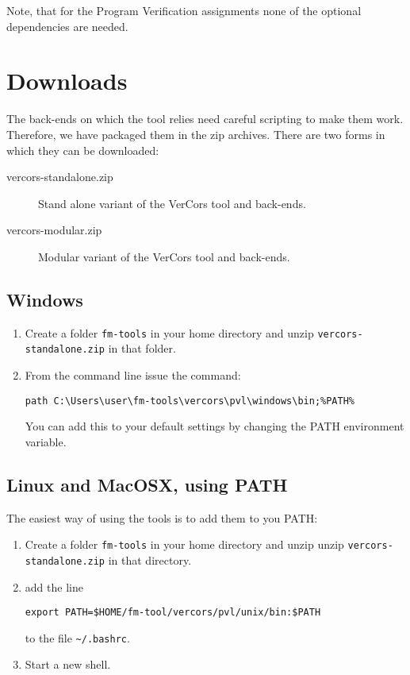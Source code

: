 Note, that for the Program Verification assignments none of the optional
dependencies are needed.

\section{Downloads}

The back-ends on which the tool relies need careful scripting to make them work.
Therefore, we have packaged them in the zip archives. There are two forms
in which they can be downloaded:
\begin{description}
\item[vercors-standalone.zip] Stand alone variant of the VerCors tool and back-ends.
\item[vercors-modular.zip] Modular variant of the VerCors tool and back-ends.
\end{description}

\subsection{Windows}

\begin{enumerate}
\item Create a folder \verb+fm-tools+ in your home directory and unzip \verb+vercors-standalone.zip+ in
that folder.
\item From the command line issue the command:
\begin{verbatim}
path C:\Users\user\fm-tools\vercors\pvl\windows\bin;%PATH%
\end{verbatim}
You can add this to your default settings by changing the PATH environment variable.
\end{enumerate}


\subsection{Linux and MacOSX, using PATH}

The easiest way of using the tools is to add them to you PATH:

\begin{enumerate}
\item Create a folder \verb+fm-tools+ in your home directory and unzip unzip \verb+vercors-standalone.zip+ in
that directory.
\item add the line
\begin{verbatim}
export PATH=$HOME/fm-tool/vercors/pvl/unix/bin:$PATH
\end{verbatim}
to the file \verb+~/.bashrc+.
\item Start a new shell.
\end{enumerate}

